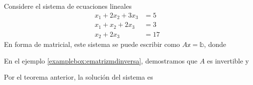 \begin{examplebox}{}{}
    Considere el sistema de ecuaciones lineales
    \begin{align*}
        x_1 + 2x_2 + 3x_3 & = 5 \\
        x_1 + x_2 + 2x_3 & = 3 \\
        x_2 + 2x_3 & = 17
    \end{align*}
    En forma de matricial, este sistema se puede escribir como $A\mathbb{x} = \mathbb{b}$, donde
    \begin{matrizn}
    \end{matrizn}
    En el ejemplo \ref{examplebox:ematrizmdinversa}, demostramos que $A$ es invertible y
    \begin{matrizn}
    \end{matrizn}
    Por el teorema anterior, la solución del sistema es
    \begin{matrizn}
    \end{matrizn}
\end{examplebox}

